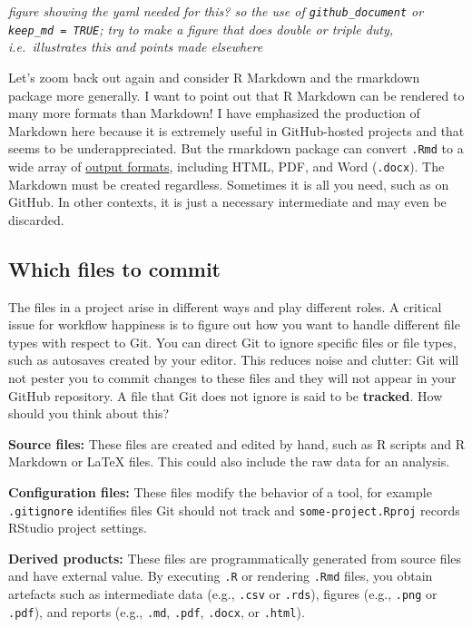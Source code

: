 \documentclass[12pt]{article}
\begin{document}
\emph{figure showing the yaml needed for this? so the use of
\texttt{github\_document} or \texttt{keep\_md\ =\ TRUE}; try to make a
figure that does double or triple duty, i.e.~illustrates this and points
made elsewhere}

Let's zoom back out again and consider R Markdown and the rmarkdown
package more generally. I want to point out that R Markdown can be
rendered to many more formats than Markdown! I have emphasized the
production of Markdown here because it is extremely useful in
GitHub-hosted projects and that seems to be underappreciated. But the
rmarkdown package can convert \texttt{.Rmd} to a wide array of
\href{http://rmarkdown.rstudio.com/lesson-9.html}{output formats},
including HTML, PDF, and Word (\texttt{.docx}). The Markdown must be
created regardless. Sometimes it is all you need, such as on GitHub. In
other contexts, it is just a necessary intermediate and may even be
discarded.

\subsection{Which files to commit}\label{which-files-to-commit}

The files in a project arise in different ways and play different roles.
A critical issue for workflow happiness is to figure out how you want to
handle different file types with respect to Git. You can direct Git to
ignore specific files or file types, such as autosaves created by your
editor. This reduces noise and clutter: Git will not pester you to
commit changes to these files and they will not appear in your GitHub
repository. A file that Git does not ignore is said to be
\textbf{tracked}. How should you think about this?

\textbf{Source files:} These files are created and edited by hand, such
as R scripts and R Markdown or LaTeX files. This could also include the
raw data for an analysis.

\textbf{Configuration files:} These files modify the behavior of a tool,
for example \texttt{.gitignore} identifies files Git should not track
and \texttt{some-project.Rproj} records RStudio project settings.

\textbf{Derived products:} These files are programmatically generated
from source files and have external value. By executing \texttt{.R} or
rendering \texttt{.Rmd} files, you obtain artefacts such as intermediate
data (e.g., \texttt{.csv} or \texttt{.rds}), figures (e.g.,
\texttt{.png} or \texttt{.pdf}), and reports (e.g., \texttt{.md},
\texttt{.pdf}, \texttt{.docx}, or \texttt{.html}).
\end{document}
